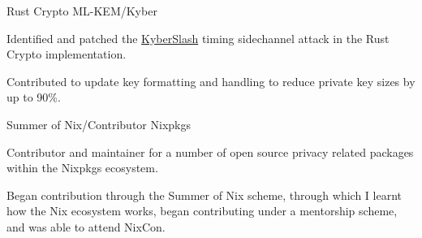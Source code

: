 


\begin{cventries}


\cventry
{Rust Crypto} %
{ML-KEM/Kyber} %
{} %
{} %
{ %
\begin{cvitems}
\item {Identified and patched the \href{https://kyberslash.cr.yp.to/}{KyberSlash} timing sidechannel attack in the Rust Crypto implementation.}
\item {Contributed to update key formatting and handling to reduce private key sizes by up to 90\%.}
\end{cvitems}
}


\cventry
{Summer of Nix/Contributor} %
{Nixpkgs} %
{} %
{} %
{ %
\begin{cvitems}
\item {Contributor and maintainer for a number of open source privacy related packages within the Nixpkgs ecosystem.}
\item {Began contribution through the Summer of Nix scheme, through which I learnt how the Nix ecosystem works, began contributing under a mentorship scheme, and was able to attend NixCon.}
\end{cvitems}
}


\end{cventries}
